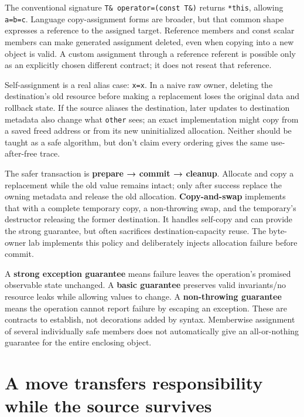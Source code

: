 The conventional signature \texttt{T\&\ operator=(const\ T\&)} returns \texttt{*this}, allowing \texttt{a=b=c}. Language copy-assignment forms are broader, but that common shape expresses a reference to the assigned target. Reference members and const scalar members can make generated assignment deleted, even when copying into a new object is valid. A custom assignment through a reference referent is possible only as an explicitly chosen different contract; it does not reseat that reference.

Self-assignment is a real alias case: \texttt{x=x}. In a naive raw owner, deleting the destination's old resource before making a replacement loses the original data and rollback state. If the source aliases the destination, later updates to destination metadata also change what \texttt{other} sees; an exact implementation might copy from a saved freed address or from its new uninitialized allocation. Neither should be taught as a safe algorithm, but don't claim every ordering gives the same use-after-free trace.

The safer transaction is \textbf{prepare → commit → cleanup}. Allocate and copy a replacement while the old value remains intact; only after success replace the owning metadata and release the old allocation. \textbf{Copy-and-swap} implements that with a complete temporary copy, a non-throwing swap, and the temporary's destructor releasing the former destination. It handles self-copy and can provide the strong guarantee, but often sacrifices destination-capacity reuse. The byte-owner lab implements this policy and deliberately injects allocation failure before commit.

A \textbf{strong exception guarantee} means failure leaves the operation's promised observable state unchanged. A \textbf{basic guarantee} preserves valid invariants/no resource leaks while allowing values to change. A \textbf{non-throwing guarantee} means the operation cannot report failure by escaping an exception. These are contracts to establish, not decorations added by syntax. Memberwise assignment of several individually safe members does not automatically give an all-or-nothing guarantee for the entire enclosing object.

\section{A move transfers responsibility while the source survives}\label{01-foundations-i-ch003-a-move-transfers-responsibility-while-the-source-survives}

